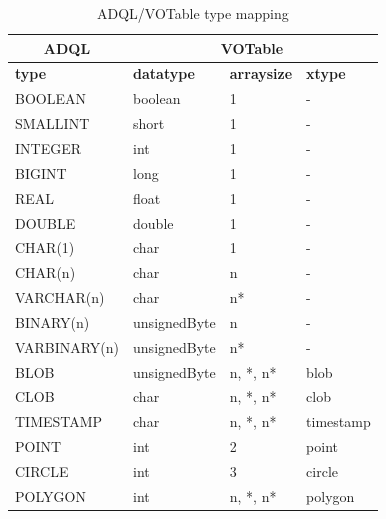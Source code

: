 \documentclass[11pt,a4paper]{ivoa}
\begin{document}
\begin{table}[thm]\footnotesize
    \begin{tabular}
        {|p{}|p{}|p{}|p{}|}
        \hline


        \hline
        \multicolumn{1}{|c|}{\textbf{ADQL}} &
        \multicolumn{3}{|c|}{\textbf{VOTable}}
        \tabularnewline
        
        \hline
        \textbf{type} &
        \textbf{datatype} &
        \textbf{arraysize} &
        \textbf{xtype}
        \tabularnewline

        \hline
        BOOLEAN &
        boolean &
        1 &
        -
        \tabularnewline

        \hline
        SMALLINT &
        short &
        1 &
        -
        \tabularnewline

        \hline
        INTEGER &
        int &
        1 &
        -
        \tabularnewline

        \hline
        BIGINT &
        long &
        1 &
        -
        \tabularnewline

        \hline
        REAL &
        float &
        1 &
        -
        \tabularnewline

        \hline
        DOUBLE &
        double &
        1 &
        -
        \tabularnewline

        \hline
        CHAR(1) &
        char &
        1 &
        -
        \tabularnewline

        \hline
        CHAR(n) &
        char &
        n &
        -
        \tabularnewline

        \hline
        VARCHAR(n) &
        char &
        n* &
        -
        \tabularnewline

        \hline
        BINARY(n) &
        unsignedByte &
        n &
        -
        \tabularnewline

        \hline
        VARBINARY(n) &
        unsignedByte &
        n* &
        -
        \tabularnewline

        \hline
        BLOB &
        unsignedByte &
        n, *, n* &
        blob
        \tabularnewline

        \hline
        CLOB &
        char &
        n, *, n* &
        clob
        \tabularnewline

        \hline
        TIMESTAMP &
        char &
        n, *, n* &
        timestamp
        \tabularnewline

        \hline
        POINT &
        int &
        2 &
        point
        \tabularnewline

        \hline
        CIRCLE &
        int &
        3 &
        circle
        \tabularnewline

        \hline
        POLYGON &
        int &
        n, *, n* &
        polygon
        \tabularnewline

        \hline
    \end{tabular}
    \caption{ADQL/VOTable type mapping}
    \label{table:adql.votable.type.map}
\end{table}
\end{document}
